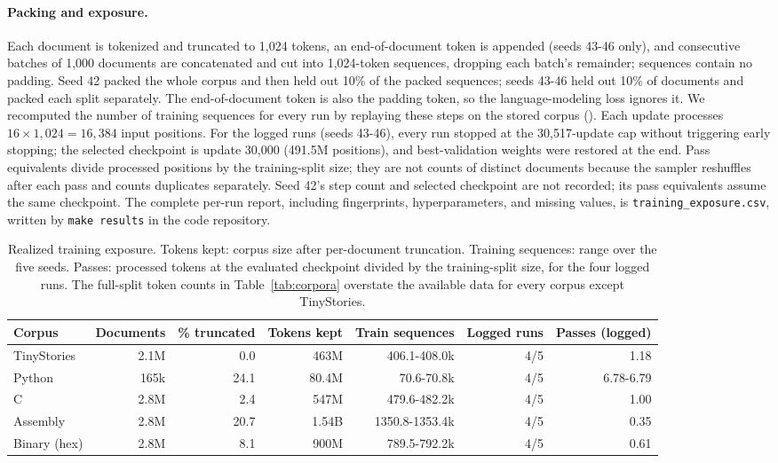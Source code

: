 \documentclass[mlmain]{jmlr}
\begin{document}
\paragraph{Packing and exposure.} Each document is tokenized and truncated to 1,024 tokens, an end-of-document token is appended (seeds 43-46 only), and consecutive batches of 1,000 documents are concatenated and cut into 1,024-token sequences, dropping each batch's remainder; sequences contain no padding. Seed 42 packed the whole corpus and then held out 10\% of the packed sequences; seeds 43-46 held out 10\% of documents and packed each split separately. The end-of-document token is also the padding token, so the language-modeling loss ignores it. We recomputed the number of training sequences for every run by replaying these steps on the stored corpus (). Each update processes $16\times1{,}024 = 16{,}384$ input positions. For the logged runs (seeds 43-46), every run stopped at the 30,517-update cap without triggering early stopping; the selected checkpoint is update 30,000 (491.5M positions), and best-validation weights were restored at the end. Pass equivalents divide processed positions by the training-split size; they are not counts of distinct documents because the sampler reshuffles after each pass and counts duplicates separately. Seed 42's step count and selected checkpoint are not recorded; its pass equivalents assume the same checkpoint. The complete per-run report, including fingerprints, hyperparameters, and missing values, is \texttt{training\_exposure.csv}, written by \texttt{make results} in the code repository.

\begin{table}[htbp]
  \centering
  \caption{Realized training exposure. Tokens kept: corpus size after per-document truncation. Training sequences: range over the five seeds. Passes: processed tokens at the evaluated checkpoint divided by the training-split size, for the four logged runs. The full-split token counts in Table~\ref{tab:corpora} overstate the available data for every corpus except TinyStories.}
  \label{tab:exposure}
  \scriptsize
  \setlength{\tabcolsep}{3pt}
  \begin{tabular}{lrrrrrr}
\toprule
Corpus & Documents & \% truncated & Tokens kept & Train sequences & Logged runs & Passes (logged) \\
\midrule
TinyStories & 2.1M & 0.0 & 463M & 406.1-408.0k & 4/5 & 1.18 \\
Python & 165k & 24.1 & 80.4M & 70.6-70.8k & 4/5 & 6.78-6.79 \\
C & 2.8M & 2.4 & 547M & 479.6-482.2k & 4/5 & 1.00 \\
Assembly & 2.8M & 20.7 & 1.54B & 1350.8-1353.4k & 4/5 & 0.35 \\
Binary (hex) & 2.8M & 8.1 & 900M & 789.5-792.2k & 4/5 & 0.61 \\
\bottomrule
\end{tabular}
\end{table}
\end{document}
